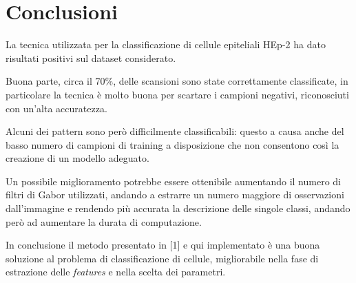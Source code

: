 \section{Conclusioni}

La tecnica utilizzata per la classificazione di cellule epiteliali HEp-2 ha dato risultati positivi sul dataset considerato.

Buona parte, circa il 70\%, delle scansioni sono state correttamente classificate, in particolare la tecnica è molto buona per scartare i campioni negativi, riconosciuti con un'alta accuratezza.

Alcuni dei pattern sono però difficilmente classificabili: questo a causa anche del basso numero di campioni di training a disposizione che non consentono così la creazione di un modello adeguato. 

Un possibile miglioramento potrebbe essere ottenibile aumentando il numero di filtri di Gabor utilizzati, andando a estrarre un numero maggiore di osservazioni dall'immagine e rendendo più accurata la descrizione delle singole classi, andando però ad aumentare la durata di computazione.



In conclusione il metodo presentato in [1] e qui implementato è una buona soluzione al problema di classificazione di cellule, migliorabile nella fase di estrazione delle \emph{features} e nella scelta dei parametri.